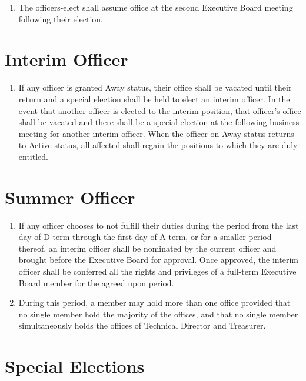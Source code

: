 \documentclass[12pt,letterpaper,oneside]{book}
\begin{document}
\begin{enumerate}
\item The officers-elect shall assume office at the second Executive Board meeting following their election.

\end{enumerate}

\section{Interim Officer}

\begin{enumerate}

\item If any officer is granted Away status, their office shall be vacated until their return and a special election shall be held to elect an interim officer. In the event that another officer is elected to the interim position, that officer’s office shall be vacated and there shall be a special election at the following business meeting for another interim officer. When the officer on Away status returns to Active status, all affected shall regain the positions to which they are duly entitled.

\end{enumerate}

\section{Summer Officer} \label{sec:summerofficer}

\begin{enumerate}

\item If any officer chooses to not fulfill their duties during the period from the last day of D term through the first day of A term, or for a smaller period thereof, an interim officer shall be nominated by the current officer and brought before the Executive Board for approval. Once approved, the interim officer shall be conferred all the rights and privileges of a full-term Executive Board member for the agreed upon period.
\item During this period, a member may hold more than one office provided that no single member hold the majority of the offices, and that no single member simultaneously holds the offices of Technical Director and Treasurer.

\end{enumerate}

\section{Special Elections} \label{sec:specialelections}
\end{document}
